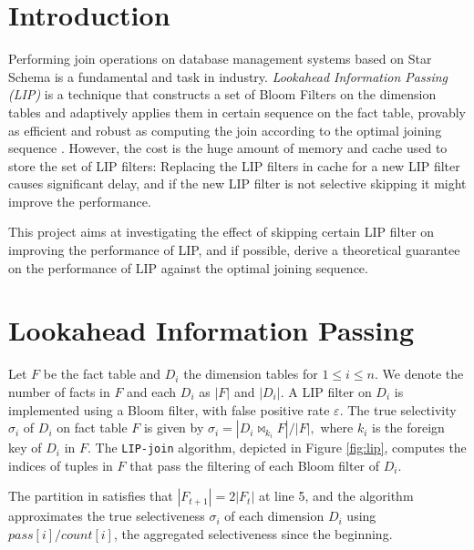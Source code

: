 \documentclass[11pt]{article}
\newcommand{\JOIN}{\bowtie}
\begin{document}
\newpage
\maketitle


\abstract{}


\section{Introduction}

Performing join operations on database management systems based on Star Schema is a fundamental and task in industry. \textit{Lookahead Information Passing (LIP)} is a technique that constructs a set of Bloom Filters on the dimension tables and adaptively applies them in certain sequence on the fact table, provably as efficient and robust as computing the join according to the optimal joining sequence \cite{zhu2017looking}. However, the cost is the huge amount of memory and cache used to store the set of LIP filters: Replacing the LIP filters in cache for a new LIP filter causes significant delay, and if the new LIP filter is not selective skipping it might improve the performance.

This project aims at investigating the effect of skipping certain LIP filter on improving the performance of LIP, and if possible, derive a theoretical guarantee on the performance of LIP against the optimal joining sequence. 



\section{Lookahead Information Passing}

Let $F$ be the fact table and $D_i$ the dimension tables for $1 \leq i \leq n$. We denote the number of facts in $F$ and each $D_i$ as $|F|$ and $|D_i|$. A LIP filter on $D_i$ is implemented using a Bloom filter, with false positive rate $\varepsilon$. The true selectivity $\sigma_i$ of $D_i$ on fact table $F$ is given by $\sigma_i = |D_i \JOIN_{k_i} F| / |F|,$ where $k_i$ is the foreign key of $D_i$ in $F$. The \texttt{LIP-join} algorithm, depicted in Figure \ref{fig:lip}, computes the indices of tuples in $F$ that pass the filtering of each Bloom filter of $D_i$.

The partition in \cite{zhu2017looking} satisfies that $|F_{t+1}| = 2|F_{t}|$ at line 5, and the algorithm approximates the true selectiveness $\sigma_i$ of each dimension $D_i$ using $pass[i]/count[i]$, the aggregated selectiveness since the beginning.
\end{document}
